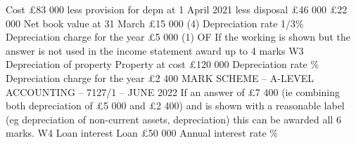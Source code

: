 \documentclass{article}
\begin{document}
Cost \newline
 \newline
£83 000  \newline
 \newline
 \newline
less provision for depn at 1 April 2021 \newline
less disposal \newline
£46 000 \newline
£22 000  \newline
 \newline
 \newline
Net book value at 31 March \newline
£15 000  (4) \newline
Depreciation rate  1/3\%  \newline
Depreciation charge for the year \newline
£5 000  (1) OF \newline
 \newline
If the working is shown but the answer is not used in the income statement award up to 4 marks \newline
 \newline
W3 Depreciation of property \newline
Property at cost \newline
£120 000 \newline
Depreciation rate \% \newline
Depreciation charge for the year \newline
£2 400 \newline
MARK SCHEME – A-LEVEL ACCOUNTING – 7127/1 – JUNE 2022  \newline
 \newline
If an answer of £7 400 (ie combining both depreciation of £5 000 and £2 400) and is shown with a \newline
reasonable label (eg depreciation of non-current assets, depreciation) this can be awarded all 6 marks. \newline
 \newline
  \newline
W4 Loan interest \newline
Loan \newline
£50 000 \newline
Annual interest rate \% \newline
\end{document}
